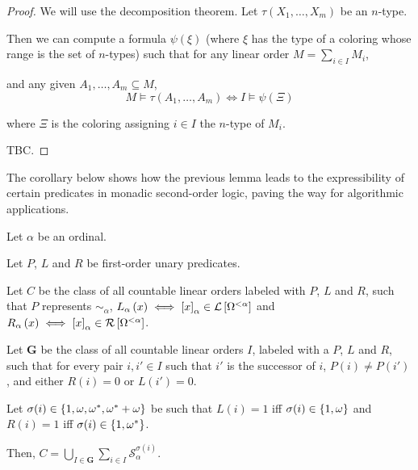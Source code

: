 \begin{proof}
  We will use the decomposition theorem.
  Let $\tau(X_1, \ldots, X_m)$ be an $n$-type.

  Then we can compute a formula $\psi(\xi)$ (where
  $\xi$ has the type of a coloring whose range is
  the set of $n$-types) such that
  for any linear order $M = \sum_{i \in I} M_i$,

  and any given $A_1, \ldots, A_m \subseteq M$,
  \[
    M \models \tau(A_1, \ldots, A_m)
    \iff I \models \psi(\Xi)
  \]

  where $\Xi$ is the coloring assigning $i \in I$ the $n$-type of $M_i$.

  TBC.
\end{proof}

The corollary below shows how the previous lemma leads to the expressibility of certain predicates in monadic
second-order logic, paving the way for algorithmic applications.

\begin{lemma}{\label{single-ordinal-decomposition}}
  Let $\alpha$ be an ordinal.

  Let $P$, $L$ and $R$ be
  first-order unary predicates.

  Let $C$ be the class of
  all countable linear orders labeled with $P$, $L$ and $R$,
  such that $P$ represents $\sim_{\alpha}$,
  $L_{\alpha} \left( {x} \right) \iff \left[ {x} \right]_{\alpha} \in \mathcal{L} \left[ {{\Omega^{< \alpha}}} \right]$ and
  $R_{\alpha} \left( {x} \right) \iff \left[ {x} \right]_{\alpha} \in \mathcal{R} \left[ {{\Omega^{< \alpha}}} \right]$.

  Let $\mathbf{G}$ be the class of all countable linear orders $I$,
  labeled with a $P$, $L$ and $R$,
  such that for every pair $i, i' \in I$ such that $i'$ is the successor of $i$,
  $P(i) \ne P(i')$,
  and either $R(i) = 0$ or $L(i') = 0$.

  Let $\sigma(i) \in \left\{ {1, \omega, \omega^\ast, \omega^\ast + \omega} \right\}$ be such that
  $L(i) = 1$ iff $\sigma(i) \in \left\{ {1, \omega} \right\}$ and
  $R(i) = 1$ iff $\sigma(i) \in \left\{ {1, \omega^\ast} \right\}$.

  Then, $C = \bigcup_{I \in \mathbf{G}} \sum_{i \in I} \mathcal{S}^{\sigma(i)}_{\alpha}$.
\end{lemma}

